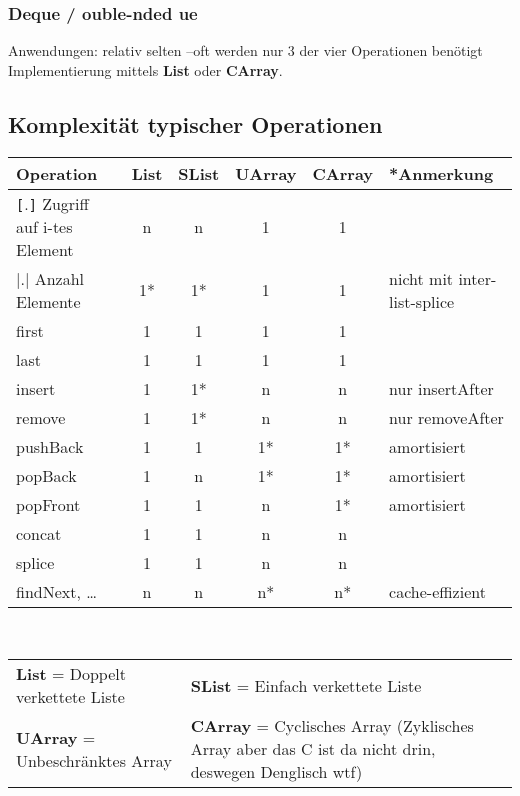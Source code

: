 \subsubsection{Deque / ouble-nded ue}
Anwendungen: relativ selten –oft werden nur 3 der vier Operationen benötigt\\
Implementierung mittels \textbf{List} oder \textbf{CArray}.

\subsection{Komplexität typischer Operationen}
\begin{tabular}{l|cccc|l}
    \toprule
    Operation & List & SList & UArray & CArray & *Anmerkung
    \\\midrule
    \verb|[|.\verb|]| Zugriff auf i-tes Element & n & n & 1 & 1 &\\
    |.| Anzahl Elemente & 1* & 1* & 1 & 1 & nicht mit inter-list-splice\\
    first & 1 & 1 & 1 & 1 &\\
    last & 1 & 1 & 1 & 1 & \\
    insert & 1 & 1* & n & n & nur insertAfter\\
    remove & 1 & 1* & n & n & nur removeAfter\\
    pushBack & 1 & 1 & 1* & 1* & amortisiert \\
    popBack & 1 & n & 1* & 1* & amortisiert \\
    popFront & 1 & 1 & n & 1* & amortisiert \\
    concat & 1 & 1 & n & n & \\
    splice & 1 & 1 & n & n & \\
    findNext, \dots & n & n & n* & n* & cache-effizient\\
    \bottomrule
\end{tabular}\\
\begin{tabular}{ll}
    \textbf{List} = Doppelt verkettete Liste & \textbf{SList} = Einfach verkettete Liste \\
    \textbf{UArray} = Unbeschränktes Array & \textbf{CArray} = Cyclisches Array (Zyklisches Array aber das C ist da nicht drin, deswegen Denglisch wtf)
\end{tabular}

